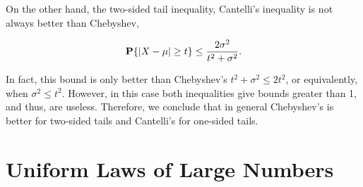 On the other hand, the two-sided tail inequality, Cantelli's inequality is not always better than Chebyshev,

\begin{corollary}
  \[\P\{|X-\mu| \geq t\} \leq \frac{2\sigma^2}{t^2 + \sigma^2}. \] 
\end{corollary}

In fact, this bound is only better than Chebyshev's $t^2+\sigma^2 \leq 2t^2$, or equivalently, when $\sigma^2 \leq t^2$. However, in this case both inequalities give bounds greater than 1, and thus, are useless. Therefore, we conclude that in general Chebyshev's is better for two-sided tails and Cantelli's for one-sided tails.


\section{Uniform Laws of Large Numbers}
